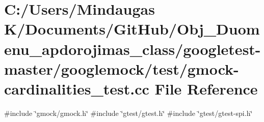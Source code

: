 \hypertarget{googletest-master_2googlemock_2test_2gmock-cardinalities__test_8cc}{}\section{C\+:/\+Users/\+Mindaugas K/\+Documents/\+Git\+Hub/\+Obj\+\_\+\+Duomenu\+\_\+apdorojimas\+\_\+class/googletest-\/master/googlemock/test/gmock-\/cardinalities\+\_\+test.cc File Reference}
\label{googletest-master_2googlemock_2test_2gmock-cardinalities__test_8cc}
{\ttfamily \#include \char`\"{}gmock/gmock.\+h\char`\"{}}\newline
{\ttfamily \#include \char`\"{}gtest/gtest.\+h\char`\"{}}\newline
{\ttfamily \#include \char`\"{}gtest/gtest-\/spi.\+h\char`\"{}}\newline
